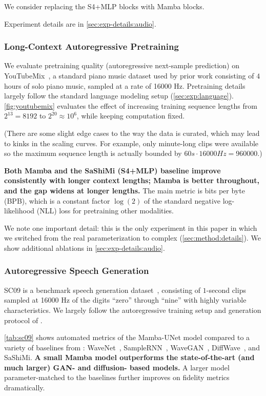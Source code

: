We consider replacing the S4+MLP blocks with Mamba blocks.

  Experiment details are in \ref{sec:exp-details:audio}.

\subsubsection{Long-Context Autoregressive Pretraining}

We evaluate pretraining quality (autoregressive next-sample prediction) on YouTubeMix~\citep{deepsound},
a standard piano music dataset used by prior work consisting of $4$ hours of solo piano music, sampled at a rate of 16000 Hz. Pretraining details largely follow the standard language modeling setup (\ref{sec:exp:language}).
\ref{fig:youtubemix} evaluates the effect of increasing training sequence lengths from $2^{13}=8192$ to $2^{20}\approx 10^6$, while keeping computation fixed.

(There are some slight edge cases to the way the data is curated, which may lead to kinks in the scaling curves. For example, only minute-long clips were available so the maximum sequence length is actually bounded by $60s \cdot 16000Hz = 960000$.)

\textbf{Both Mamba and the SaShiMi (S4+MLP) baseline improve consistently with longer context lengths; Mamba is better throughout, and the gap widens at longer lengths.} The main metric is bits per byte (BPB), which is a constant factor $\log(2)$ of the standard negative log-likelihood (NLL) loss for pretraining other modalities.

We note one important detail: this is the only experiment in this paper in which we switched from the real parameterization to complex (\ref{sec:method:details}).
We show additional ablations in \ref{sec:exp-details:audio}.

\subsubsection{Autoregressive Speech Generation}

SC09 is a benchmark speech generation dataset~\citep{Warden2018SpeechCA,donahue2019adversarial}, consisting of $1$-second clips sampled at 16000 Hz of the digits ``zero'' through ``nine'' with highly variable characteristics. We largely follow the autoregressive training setup and generation protocol of \citep{goel2022raw}.

\ref{tab:sc09} shows automated metrics of the Mamba-UNet model compared to a variety of baselines from \citep{goel2022raw}:
WaveNet~\citep{oord2016wavenet}, SampleRNN~\citep{mehri2017samplernn}, WaveGAN~\citep{donahue2019adversarial}, DiffWave~\citep{kong2021diffwave}, and SaShiMi.
\textbf{A small Mamba model outperforms the state-of-the-art (and much larger) GAN- and diffusion- based models.} A larger model parameter-matched to the baselines further improves on fidelity metrics dramatically.

